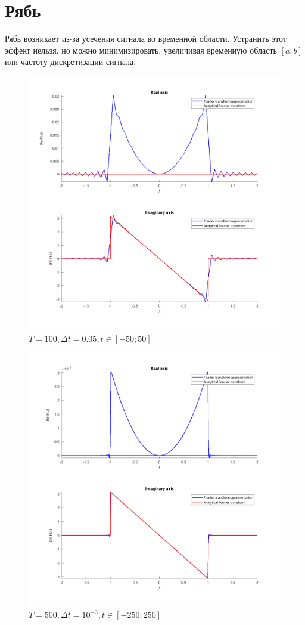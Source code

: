 
\section{Рябь}
Рябь возникает из-за усечения сигнала во временной области. Устранить этот эффект нельзя, но можно минимизировать, увеличивая временную область $[a, b] $ или частоту дискретизации сигнала. \\
\begin{figure}[h]
\centering
\includegraphics[width=\textwidth, height=0.7\textheight]{Gibbs}
\caption{$ T = 100, \Delta t = 0.05, t \in [-50; 50] $}
\end{figure}

\begin{figure}[h]
\centering
\includegraphics[width=\textwidth, height=0.7\textheight]{Gibbs-2}
\caption{$ T = 500, \Delta t = 10^{-3}, t \in [-250; 250] $}
\end{figure}